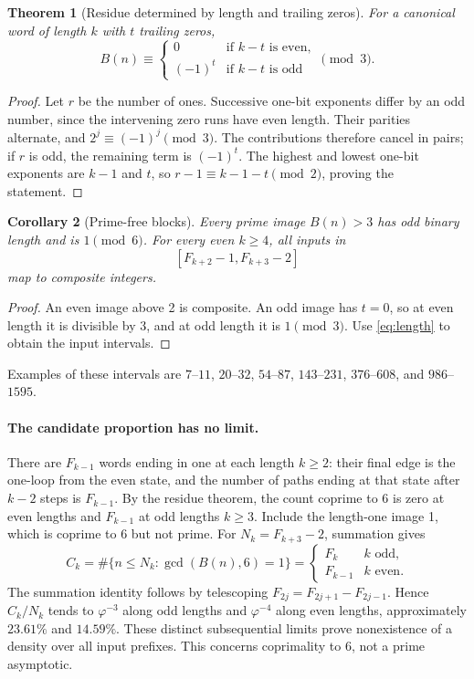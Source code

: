 \documentclass[11pt]{article}
\newtheorem{theorem}{Theorem}[section]
\newtheorem{corollary}[theorem]{Corollary}
\theoremstyle{definition}\newtheorem{definition}[theorem]{Definition}
\newcommand{\ph}{\varphi}
\begin{document}
\begin{theorem}[Residue determined by length and trailing zeros]
For a canonical word of length $k$ with $t$ trailing zeros,
\[
B(n)\equiv
\begin{cases}
0 & \text{if }k-t\text{ is even},\\
(-1)^t & \text{if }k-t\text{ is odd}
\end{cases}\pmod3.
\]
\end{theorem}
\begin{proof}
Let $r$ be the number of ones. Successive one-bit exponents differ by an
odd number, since the intervening zero runs have even length. Their
parities alternate, and $2^j\equiv(-1)^j\pmod3$. The contributions
therefore cancel in pairs; if $r$ is odd, the remaining term is
$(-1)^t$. The highest and lowest one-bit exponents are $k-1$ and $t$,
so $r-1\equiv k-1-t\pmod2$, proving the statement.
\end{proof}

\begin{corollary}[Prime-free blocks]
Every prime image $B(n)>3$ has odd binary length and is $1\pmod6$.
For every even $k\ge4$, all inputs in
\[
[F_{k+2}-1,F_{k+3}-2]
\]
map to composite integers.
\end{corollary}
\begin{proof}
An even image above 2 is composite. An odd image has $t=0$, so at even
length it is divisible by 3, and at odd length it is $1\pmod3$.
Use \eqref{eq:length} to obtain the input intervals.
\end{proof}
Examples of these intervals are $7$--$11$, $20$--$32$, $54$--$87$,
$143$--$231$, $376$--$608$, and $986$--$1595$.

\paragraph{The candidate proportion has no limit.}
There are $F_{k-1}$ words ending in one at each length $k\ge2$:
their final edge is the one-loop from the even state, and the number
of paths ending at that state after $k-2$ steps is $F_{k-1}$.
By the residue theorem, the count coprime to 6 is zero at even lengths
and $F_{k-1}$ at odd lengths $k\ge3$. Include the length-one image 1,
which is coprime to 6 but not prime. For $N_k=F_{k+3}-2$, summation gives
\[
C_k=\#\{n\le N_k:\gcd(B(n),6)=1\}
=\begin{cases}F_k&k\text{ odd},\\F_{k-1}&k\text{ even}.\end{cases}
\]
The summation identity follows by telescoping
$F_{2j}=F_{2j+1}-F_{2j-1}$. Hence $C_k/N_k$ tends to $\ph^{-3}$ along
odd lengths and $\ph^{-4}$ along even lengths, approximately $23.61\%$
and $14.59\%$. These distinct subsequential limits prove nonexistence of
a density over all input prefixes. This concerns coprimality to 6, not
a prime asymptotic.
\end{document}

